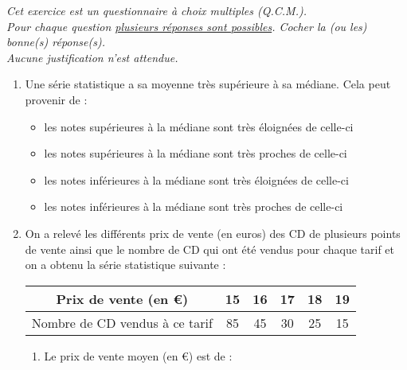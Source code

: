 \begin{exo}[8 points]
\emph{Cet exercice est un questionnaire \`a choix multiples (Q.C.M.).\\
Pour chaque question \underline{plusieurs r\'eponses sont possibles}.
Cocher la (ou les) bonne(s) r\'eponse(s). \\
Aucune justification n'est attendue.}

\begin{enumerate}
 \item Une s\'erie statistique a sa moyenne tr\`es sup\'erieure \`a sa m\'ediane. Cela peut provenir de :
 \renewcommand{\labelitemi}{$\square$}
		\begin{itemize}
			\item les notes sup\'erieures \`a la m\'ediane sont tr\`es \'eloign\'ees de celle-ci %
			\item les notes sup\'erieures \`a la m\'ediane sont tr\`es proches de celle-ci %
			\item les notes inf\'erieures \`a la m\'ediane sont tr\`es \'eloign\'ees de celle-ci %
			\item les notes inf\'erieures \`a la m\'ediane sont tr\`es proches de celle-ci 
		\end{itemize}%
 \item On a relev\'e les diff\'erents prix de vente (en euros) des CD de plusieurs points de vente ainsi que le nombre de CD qui ont \'et\'e vendus pour chaque tarif et on a obtenu la s\'erie statistique suivante :
 \begin{center}
  \begin{tabular}{c|c|c|c|c|c}
   Prix de vente (en \euro{}) & 15 & 16 & 17 & 18 & 19 \\ \hline
   Nombre de CD vendus \`a ce tarif & 85 & 45 & 30 & 25 & 15
  \end{tabular}
 \end{center}
 \begin{enumerate}
  \item Le prix de vente moyen (en \euro{}) est de :
  \renewcommand{\labelitemi}{$\square$}
	\vspace{-1em}\begin{multicols}{3}
		\begin{itemize}

\end{itemize}
\end{multicols}
\end{enumerate}
\end{enumerate}
\end{exo}
